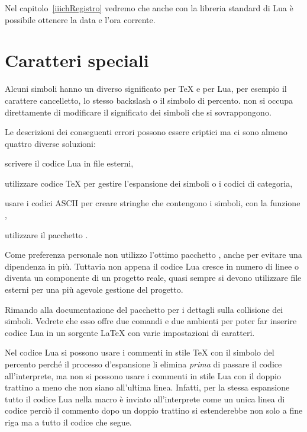 Nel capitolo~\ref{iiichRegistro} vedremo che anche con la libreria standard di
Lua è possibile ottenere la data e l'ora corrente.


\section{Caratteri speciali}

Alcuni simboli hanno un diverso significato per \TeX{} e per Lua, per esempio il
carattere cancelletto, lo stesso backslash o il simbolo di percento. \LuaTeX{}
non si occupa direttamente di modificare il significato dei simboli che si
sovrappongono.

Le descrizioni dei conseguenti errori possono essere criptici ma ci sono almeno
quattro diverse soluzioni:
\begin{compactitemize}
\item scrivere il codice Lua in file esterni,
\item utilizzare codice \TeX{} per gestire l'espansione dei simboli o i codici
di categoria,
\item usare i codici ASCII per creare stringhe che contengono i simboli, con la
funzione ,
\item utilizzare il pacchetto .
\end{compactitemize}

Come preferenza personale non utilizzo l'ottimo pacchetto ,
anche per evitare una dipendenza in più. Tuttavia non appena il codice Lua
cresce in numero di linee o diventa un componente di un progetto reale, quasi
sempre si devono utilizzare file esterni per una più agevole gestione del
progetto.

Rimando alla documentazione del pacchetto  per i dettagli sulla
collisione dei simboli. Vedrete che esso offre due comandi e due ambienti per
poter far inserire codice Lua in un sorgente \LaTeX{} con varie impostazioni di
caratteri.

Nel codice Lua si possono usare i commenti in stile \TeX{} con il simbolo del
percento perché il processo d'espansione li elimina \emph{prima} di passare il
codice all'interprete, ma non si possono usare i commenti in stile Lua con il
doppio trattino a meno che non siano all'ultima linea. Infatti, per la stessa
espansione tutto il codice Lua nella macro  è inviato
all'interprete come un unica linea di codice perciò il commento dopo un doppio
trattino si estenderebbe non solo a fine riga ma a tutto il codice che segue.

